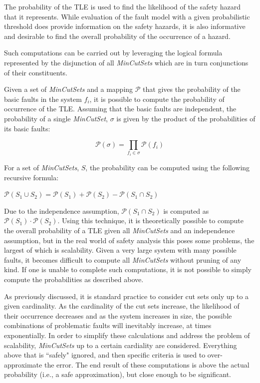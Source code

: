 The probability of the TLE is used to find the likelihood of the safety hazard that it represents. While evaluation of the fault model with a given probabilistic threshold does provide information on the safety hazards, it is also informative and desirable to find the overall probability of the occurrence of a hazard. 

Such computations can be carried out by leveraging the logical formula represented by the disjunction of all \textit{MinCutSets} which are in turn conjunctions of their constituents. 

Given a set of \textit{MinCutSets} and a mapping $\mathcal{P}$ that gives the probability of the basic faults in the system $f_i$, it is possible to compute the probability of occurrence of the TLE. Assuming that the basic faults are independent, the probability of a single \textit{MinCutSet}, $\sigma$ is given by the product of the probabilities of its basic faults:
\begin{center}
    \begin{equation*}\mathcal{P}(\sigma) = \prod_{f_i \in \sigma} \mathcal{P}(f_i) 
    \end{equation*}    
\end{center}

For a set of \textit{MinCutSets}, $S$, the probability can be computed using the following recursive formula:

\begin{center}
    $\mathcal{P}(S_1 \cup S_2) = \mathcal{P}(S_1) + \mathcal{P}(S_2) - \mathcal{P}(S_1 \cap S_2)$
\end{center}

Due to the independence assumption, $\mathcal{P}(S_1 \cap S_2)$ is computed as $\mathcal{P}(S_1) \cdot   \mathcal{P}(S_2)$. Using this technique, it is theoretically possible to compute the overall probability of a TLE given all \textit{MinCutSets} and an independence assumption, but in the real world of safety analysis this poses some problems, the largest of which is scalability. Given a very large system with many possible faults, it becomes difficult to compute all \textit{MinCutSets} without pruning of any kind. If one is unable to complete such computations, it is not possible to simply compute the probabilities as described above. 

As previously discussed, it is standard practice to consider cut sets only up to a given cardinality. As the cardinality of the cut sets increase, the likelihood of their occurrence decreases and as the system increases in size, the possible combinations of problematic faults will inevitably increase, at times exponentially. In order to simplify these calculations and address the problem of scalability, \textit{MinCutSets} up to a certain cardiality are considered. Everything above that is ``safely" ignored, and then specific criteria is used to over-approximate the error. The end result of these computations is above the actual probability (i.e., a safe approximation), but close enough to be significant. 

